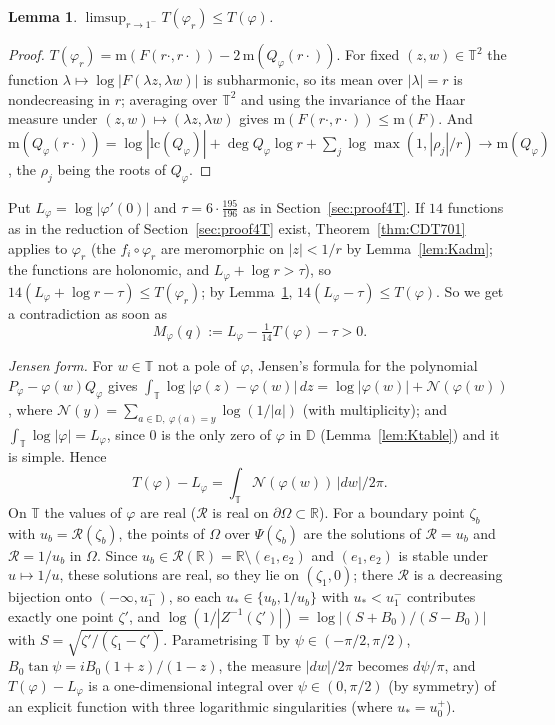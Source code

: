 \documentclass[11pt]{amsart}
\newtheorem{lemma}[proposition]{Lemma}
\theoremstyle{definition}
\theoremstyle{remark}
\numberwithin{equation}{section}
\newcommand{\RR}{\mathbb{R}}
\newcommand{\DD}{\mathbb{D}}
\newcommand{\TT}{\mathbb{T}}
\begin{document}
\begin{lemma}\label{lem:Tlim}
$\limsup_{r\to1^-}T(\varphi_r)\le T(\varphi)$.
\end{lemma}

\begin{proof}
$T(\varphi_r)=\mathrm m(F(r\cdot,r\cdot))-2\,\mathrm m(Q_\varphi(r\cdot))$. For fixed $(z,w)\in\TT^2$ the function
$\lambda\mapsto\log|F(\lambda z,\lambda w)|$ is subharmonic, so its mean over $|\lambda|=r$ is nondecreasing in $r$;
averaging over $\TT^2$ and using the invariance of the Haar measure under $(z,w)\mapsto(\lambda z,\lambda w)$ gives
$\mathrm m(F(r\cdot,r\cdot))\le\mathrm m(F)$. And $\mathrm m(Q_\varphi(r\cdot))=\log|\mathrm{lc}(Q_\varphi)|+\deg Q_\varphi\log r+
\sum_j\log\max(1,|\rho_j|/r)\to\mathrm m(Q_\varphi)$, the $\rho_j$ being the roots of $Q_\varphi$.
\end{proof}

Put $L_\varphi=\log|\varphi'(0)|$ and $\tau=6\cdot\frac{195}{196}$ as in Section~\ref{sec:proof4T}. If $14$ functions as in
the reduction of Section~\ref{sec:proof4T} exist, Theorem~\ref{thm:CDT701} applies to $\varphi_r$ (the $f_i\circ\varphi_r$
are meromorphic on $|z|<1/r$ by Lemma~\ref{lem:Kadm}; the functions are holonomic, and $L_\varphi+\log r>\tau$), so
$14(L_\varphi+\log r-\tau)\le T(\varphi_r)$; by Lemma~\ref{lem:Tlim}, $14(L_\varphi-\tau)\le T(\varphi)$. So we get a
contradiction as soon as
\[
M_\varphi(q):=L_\varphi-\tfrac1{14}T(\varphi)-\tau>0 .
\]

\emph{Jensen form.} For $w\in\TT$ not a pole of $\varphi$, Jensen's formula for the polynomial
$P_\varphi-\varphi(w)Q_\varphi$ gives $\int_\TT\log|\varphi(z)-\varphi(w)|\,dz=\log|\varphi(w)|+\mathcal N(\varphi(w))$, where
$\mathcal N(y)=\sum_{a\in\DD,\ \varphi(a)=y}\log(1/|a|)$ (with multiplicity); and $\int_\TT\log|\varphi|=L_\varphi$, since
$0$ is the only zero of $\varphi$ in $\DD$ (Lemma~\ref{lem:Ktable}) and it is simple. Hence
\[
T(\varphi)-L_\varphi=\int_\TT\mathcal N(\varphi(w))\,|dw|/2\pi .
\]
On $\TT$ the values of $\varphi$ are real ($\mathcal R$ is real on $\partial\Omega\subset\RR$). For a boundary point $\zeta_b$ with
$u_b=\mathcal R(\zeta_b)$, the points of $\Omega$ over $\Psi(\zeta_b)$ are the solutions of $\mathcal R=u_b$ and $\mathcal R=1/u_b$
in $\Omega$. Since $u_b\in\mathcal R(\RR)=\RR\setminus(e_1,e_2)$ and $(e_1,e_2)$ is stable under $u\mapsto1/u$, these
solutions are real, so they lie on $(\zeta_1,0)$; there $\mathcal R$ is a decreasing bijection onto $(-\infty,u_1^-)$, so
each $u_*\in\{u_b,1/u_b\}$ with $u_*<u_1^-$ contributes exactly one point $\zeta'$, and $\log(1/|Z^{-1}(\zeta')|)=
\log|(S+B_0)/(S-B_0)|$ with $S=\sqrt{\zeta'/(\zeta_1-\zeta')}$. Parametrising $\TT$ by $\psi\in(-\pi/2,\pi/2)$,
$B_0\tan\psi=iB_0(1+z)/(1-z)$, the measure $|dw|/2\pi$ becomes $d\psi/\pi$, and $T(\varphi)-L_\varphi$ is a one-dimensional
integral over $\psi\in(0,\pi/2)$ (by symmetry) of an explicit function with three logarithmic singularities (where
$u_*=u_0^+$).
\end{document}
